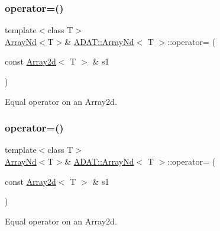 \subsubsection{\texorpdfstring{operator=()}{operator=()}\hspace{0.1cm}{\footnotesize\ttfamily [7/15]}}
{\footnotesize\ttfamily template$<$class T$>$ \\
\mbox{\hyperlink{classADAT_1_1ArrayNd}{Array\+Nd}}$<$T$>$\& \mbox{\hyperlink{classADAT_1_1ArrayNd}{A\+D\+A\+T\+::\+Array\+Nd}}$<$ T $>$\+::operator= (\begin{DoxyParamCaption}\item[{const \mbox{\hyperlink{classXMLArray_1_1Array2d}{Array2d}}$<$ T $>$ \&}]{s1 }\end{DoxyParamCaption})\hspace{0.3cm}{\ttfamily [inline]}}



Equal operator on an Array2d. 

\mbox{\label{classADAT_1_1ArrayNd_a95293530c9643394ae8133f0203d342b}} 
\subsubsection{\texorpdfstring{operator=()}{operator=()}\hspace{0.1cm}{\footnotesize\ttfamily [8/15]}}
{\footnotesize\ttfamily template$<$class T$>$ \\
\mbox{\hyperlink{classADAT_1_1ArrayNd}{Array\+Nd}}$<$T$>$\& \mbox{\hyperlink{classADAT_1_1ArrayNd}{A\+D\+A\+T\+::\+Array\+Nd}}$<$ T $>$\+::operator= (\begin{DoxyParamCaption}\item[{const \mbox{\hyperlink{classXMLArray_1_1Array2d}{Array2d}}$<$ T $>$ \&}]{s1 }\end{DoxyParamCaption})\hspace{0.3cm}{\ttfamily [inline]}}



Equal operator on an Array2d. 

\mbox{\label{classADAT_1_1ArrayNd_a95293530c9643394ae8133f0203d342b}} 
